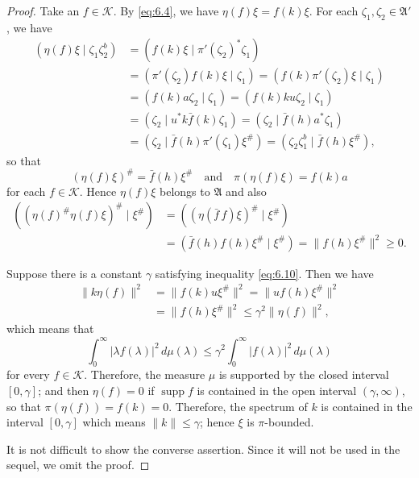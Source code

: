 \documentclass[12pt,b5paper,twoside]{article}
\theoremstyle{takesaki}
\numberwithin{equation}{section}
\begin{document}
\begin{proof}
Take an $f\in\mathcal K$.  By \eqref{eq:6.4}, we have
$\eta(f)\xi=f(k)\xi$.  For each $\zeta_1,\zeta_2\in\mathfrak A'$, we
have
\begin{align*}
 (\eta(f)\xi\mid\zeta_1\zeta_2^b)
  &=(f(k)\xi\mid\pi'(\zeta_2)^*\zeta_1)\\
  &=(\pi'(\zeta_2)f(k)\xi\mid\zeta_1)
   =(f(k)\pi'(\zeta_2)\xi\mid\zeta_1)\\
  &=(f(k)a\zeta_2\mid\zeta_1)
   =(f(k)ku\zeta_2\mid\zeta_1)\\
  &=(\zeta_2\mid u^*k\bar f(k)\zeta_1)
   =(\zeta_2\mid\bar f(h)a^*\zeta_1)\\
  &=(\zeta_2\mid\bar f(h)\pi'(\zeta_1)\xi^\#)
   =(\zeta_2\zeta_1^b\mid\bar f(h)\xi^\#),
\end{align*}
so that
\begin{equation}
 (\eta(f)\xi)^\#=\bar f(h)\xi^\#
 \quad\text{and}\quad
 \pi(\eta(f)\xi)=f(k)a
 \tag{6.11}\label{eq:6.11}
\end{equation}
for each $f\in\mathcal K$.  Hence $\eta(f)\xi$ belongs to
$\mathfrak A$ and also
\begin{align*}
 ((\eta(f)^\#\eta(f)\xi)^\#\mid\xi^\#)
  &=((\eta(\bar f\,f)\xi)^\#\mid\xi^\#)\\
  &=(\bar f(h)f(h)\xi^\#\mid\xi^\#)
   =\|f(h)\xi^\#\|^2\geq0.
\end{align*}

Suppose there is a constant $\gamma$ satisfying inequality
\eqref{eq:6.10}.  Then we have
\begin{align*}
 \|k\eta(f)\|^2
  &=\|f(k)u\xi^\#\|^2
   =\|uf(h)\xi^\#\|^2\\
  &=\|f(h)\xi^\#\|^2
   \leq\gamma^2\|\eta(f)\|^2,
\end{align*}
which means that
\[
 \int_0^\infty|\lambda f(\lambda)|^2\,d\mu(\lambda)
 \leq\gamma^2\int_0^\infty|f(\lambda)|^2\,d\mu(\lambda)
\]
for every $f\in\mathcal K$.  Therefore, the measure $\mu$ is supported
by the closed interval $[0,\gamma]$; and then $\eta(f)=0$ if
$\operatorname{supp}f$ is contained in the open interval
$(\gamma,\infty)$, so that $\pi(\eta(f))=f(k)=0$.  Therefore, the
spectrum of $k$ is contained in the interval $[0,\gamma]$ which means
$\|k\|\leq\gamma$; hence $\xi$ is $\pi$-bounded.

It is not difficult to show the converse assertion.  Since it will not
be used in the sequel, we omit the proof.
\end{proof}
\end{document}
